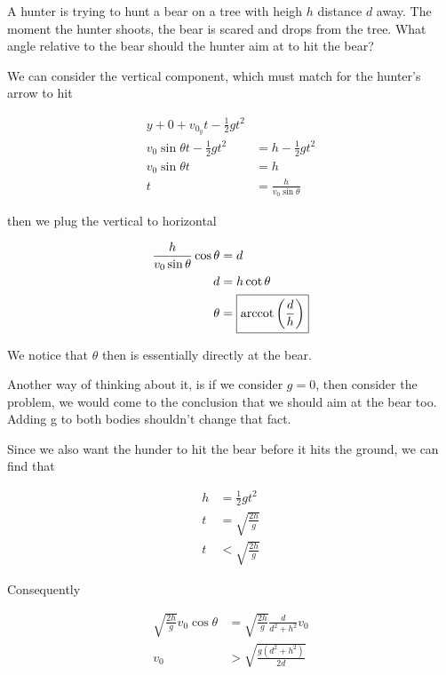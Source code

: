 \begin{example}
	A hunter is trying to hunt a bear on a tree with heigh $h$ distance $d$ away. The moment the hunter shoots, the bear is scared and drops from the tree. What angle relative to the bear should the hunter aim at to hit the bear?
\end{example}

\begin{sol}
	We can consider the vertical component, which must match for the hunter's arrow to hit

	\begin{align}
		y+0 + v_{0_y} t - \frac{1}{2}gt^2&\\
		v_0\sin\theta t - \frac{1}{2}gt^2 &= h - \frac{1}{2}gt^2\\
		v_0\sin\theta t &= h\\
		t &= \frac{h}{v_0\sin\theta}
	\end{align}

	then we plug the vertical to horizontal

	\begin{align}
		\frac{h}{v_0\sin\theta}\cos\theta &= d\\
		d&= h\cot\theta\\
		\theta &= \boxed{\arccotangent\left(\frac{d}{h}\right)}
	\end{align}

	We notice that $\theta$ then is essentially directly at the bear.

	\begin{remark}
		Another way of thinking about it, is if we consider $g = 0$, then consider the problem, we would come to the conclusion that we should aim at the bear too. Adding g to both bodies shouldn't change that fact.
	\end{remark}

	Since we also want the hunder to hit the bear before it hits the ground, we can find that

	\begin{align}
		h &= \frac{1}{2}gt^2\\
		t &= \sqrt{\frac{2h}{g}}\\
		t &< \sqrt{\frac{2h}{g}}
	\end{align}

	Consequently

	\begin{align}
		\sqrt{\frac{2h}{g}} v_0 \cos\theta &= \sqrt{\frac{2h}{g}} \frac{d}{d^2 + h^2} v_0\\
		v_0 &> \boxed{\sqrt{\frac{g(d^2 + h^2)}{2d}}}
	\end{align}
\end{sol}

